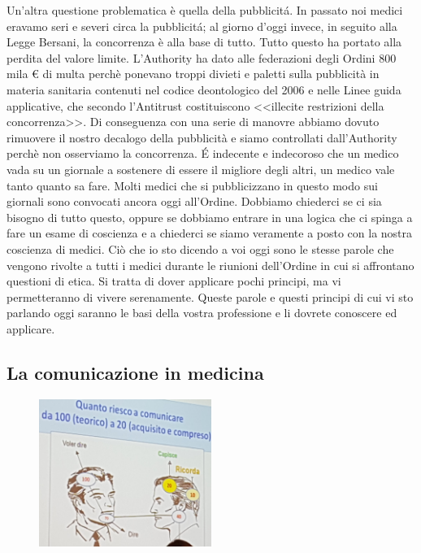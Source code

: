 Un'altra questione problematica è quella della pubblicitá. In passato
noi medici eravamo seri e severi circa la pubblicitá; al giorno d'oggi
invece, in seguito alla Legge Bersani, la concorrenza è alla base di
tutto. Tutto questo ha portato alla perdita del valore limite.
L'Authority ha dato alle federazioni degli Ordini 800 mila \euro{} di
multa perchè ponevano troppi divieti e paletti sulla pubblicità in
materia sanitaria contenuti nel codice deontologico del 2006 e nelle
Linee guida applicative, che secondo l'Antitrust costituiscono
\textless{}\textless{}illecite restrizioni della
concorrenza\textgreater{}\textgreater{}. Di conseguenza con una serie di
manovre abbiamo dovuto rimuovere il nostro decalogo della pubblicità e
siamo controllati dall'Authority perchè non osserviamo la concorrenza. É
indecente e indecoroso che un medico vada su un giornale a sostenere di
essere il migliore degli altri, un medico vale tanto quanto sa fare.
Molti medici che si pubblicizzano in questo modo sui giornali sono
convocati ancora oggi all'Ordine. Dobbiamo chiederci se ci sia bisogno
di tutto questo, oppure se dobbiamo entrare in una logica che ci spinga
a fare un esame di coscienza e a chiederci se siamo veramente a posto
con la nostra coscienza di medici. Ciò che io sto dicendo a voi oggi
sono le stesse parole che vengono rivolte a tutti i medici durante le
riunioni dell'Ordine in cui si affrontano questioni di etica. Si tratta
di dover applicare pochi principi, ma vi permetteranno di vivere
serenamente. Queste parole e questi principi di cui vi sto parlando oggi
saranno le basi della vostra professione e li dovrete conoscere ed
applicare.

\subsection{La comunicazione in medicina}

\begin{figure}[!ht]
\centering
	\includegraphics[width=0.5\textwidth]{29/image7.jpeg}
	\end{figure}


